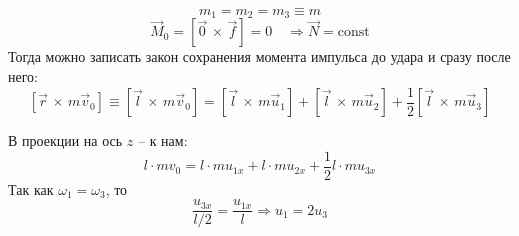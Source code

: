 \documentclass[a5paper,10pt]{article}
\begin{document}
\begin{equation*}
    m_1=m_2=m_3\equiv m
\end{equation*}
\begin{equation}
    \vec{M}_0=[\vec{0}\,\times\,\vec{f}]=0 \quad \Longrightarrow \vec{N}=\text{const}
\end{equation}
Тогда можно записать закон сохранения момента импульса до удара и сразу после него:
\begin{equation}
    \label{eq1}
    [\vec{r}\,\times\,{m\vec{v}_0}]
    \equiv [\vec{l}\,\times\,{m\vec{v}_0}]=
    [\vec{l}\,\times\,{m\vec{u}_1}]+
    [\vec{l}\,\times\,{m\vec{u}_2}]+
    \frac{1}{2}[\vec{l}\,\times\,{m\vec{u}_3}]
\end{equation}

В проекции на ось $z$ -- к нам:
\begin{equation}
    \label{eq:zsmi}
    l\cdot mv_0 = 
                l\cdot mu_{1x}+
                l\cdot mu_{2x}+
                \frac{1}{2}l\cdot mu_{3x}
\end{equation}
Так как $\omega_1=\omega_3$, то 
\begin{equation}
    \label{eq:omega}
    \frac{u_{3x}}{l/2}=\frac{u_{1x}}{l}
    \Longrightarrow
    u_1=2u_3
\end{equation}
\end{document}
